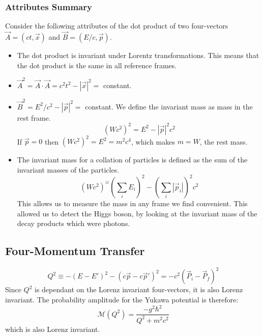 \subsubsection{Attributes Summary}
Consider the following attributes of the dot product of two four-vectors $\vec{A} = (ct,\vec{x})$ and $\vec{B} = (E / c , \vec{p})$. 
\begin{itemize}
    \item The dot product is invariant under Lorentz transformations. This means that the dot product is the same in all reference frames.
    \item $\vec{A}^2 = \vec{A} ⋅ \vec{A} = c^2t^2 - \left|\vec{x}\right|^2 = $ constant. 
    \item $\vec{B}^2 = E^2 / c^2 - \left|\vec{p}\right|^2 = $ constant. We define the invariant mass as mass in the rest frame. 
    \begin{equation}
      (Wc^2)^2 = E^2 - \left|\vec{p}\right|^2c^2
    \end{equation}
    If $\vec{p} = 0$ then $(Wc^2)^2 = E^2 = m^2c^{4}$, which makes $m = W$, the rest mass. 
    \item The invariant mass for a collation of particles is defined as the sum of the invariant masses of the particles.
    \begin{equation}
      (Wc^2)^ ≡ \left(∑_{i}^{} E_i\right)^2 - \left(∑_{i}^{} \left|\vec{p}_i\right|\right)^2c^2
    \end{equation}
    This allows us to measure the mass in any frame we find convenient. This allowed us to detect the Higgs boson, by looking at the invariant mass of the decay products which were photons. 
\end{itemize}

\subsection{Four-Momentum Transfer}
\begin{equation}
  Q^2 ≡ - \left(E - E'\right)^2 - \left(c \vec{p} - c \vec{p}'\right)^2 = - c^2 \left(\vec{P}_i - \vec{P}_f\right)^2
\end{equation}
Since $Q^2$ is dependant on the Lorenz invariant four-vectors, it is also Lorenz invariant. The probability amplitude for the Yukawa potential is therefore: 
\begin{equation}
  \mathcal{M} (Q^2) = \frac{-g^2 ℏ^2}{Q^2 + m^2 c^2}
\end{equation}
which is also Lorenz invariant.


